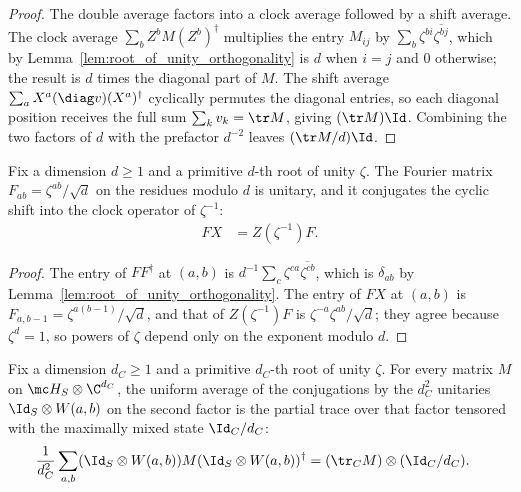 \begin{proof}\leanok
    The double average factors into a clock average followed by a shift average.
    The clock average $\sum_bZ^bM(Z^b)^\dagger$ multiplies the entry
    $M_{ij}$ by $\sum_b\zeta^{bi}\overline{\zeta^{bj}}$, which by
    Lemma~\ref{lem:root_of_unity_orthogonality} is $d$ when $i=j$ and $0$
    otherwise; the result is $d$ times the diagonal part of $M$. The shift
    average $\sum_aX^a(\diag v)(X^a)^\dagger$
    cyclically permutes the diagonal entries, so each diagonal position receives
    the full sum $\sum_kv_k=\tr M$, giving $(\tr M)\Id$. Combining the two
    factors of $d$ with the prefactor $d^{-2}$ leaves $(\tr M/d)\Id$.
\end{proof}

\begin{lemma}
    \label{lem:weyl_fourier}
    \leanok
    Fix a dimension $d\ge1$ and a primitive $d$-th root of unity $\zeta$. The
    Fourier matrix $F_{ab}=\zeta^{ab}/\sqrt d$ on the residues modulo $d$ is
    unitary, and it conjugates the cyclic shift into the clock operator of
    $\zeta^{-1}$:
    \begin{align}
        FX & =Z(\zeta^{-1})F.
        \label{eq:entropy_weyl_fourier_shift}
    \end{align}
\end{lemma}

\begin{proof}\leanok
    The entry of $FF^\dagger$ at $(a,b)$ is
    $d^{-1}\sum_c\zeta^{ca}\overline{\zeta^{cb}}$, which is $\delta_{ab}$ by
    Lemma~\ref{lem:root_of_unity_orthogonality}. The entry of $FX$ at $(a,b)$ is
    $F_{a,b-1}=\zeta^{a(b-1)}/\sqrt d$, and that of $Z(\zeta^{-1})F$ is
    $\zeta^{-a}\zeta^{ab}/\sqrt d$; they agree because $\zeta^d=1$, so powers of
    $\zeta$ depend only on the exponent modulo $d$.
\end{proof}

\begin{lemma}
    \label{lem:twirl_partial_trace}
    \leanok
    Fix a dimension $d_C\ge1$ and a primitive $d_C$-th root of unity $\zeta$.
    For every matrix $M$ on $\mc H_S\otimes\C^{d_C}$, the uniform
    average of the conjugations by the $d_C^2$ unitaries
    $\Id_S\otimes W(a,b)$ on the second factor is the partial trace over
    that factor tensored with the maximally mixed state $\Id_C/d_C$:
    \begin{align}
        \frac{1}{d_C^2}\sum_{a,b}
        (\Id_S\otimes W(a,b))M(\Id_S\otimes W(a,b))^\dagger
         & =(\tr_C M)\otimes(\Id_C/d_C).
        \label{eq:entropy_partial_trace_twirl}
    \end{align}
\end{lemma}

